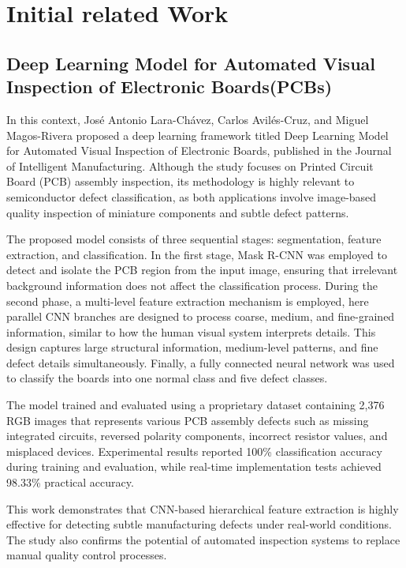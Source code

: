 \section{Initial related Work}
\subsection{Deep Learning Model for Automated Visual Inspection of Electronic Boards(PCBs)}
In this context, José Antonio Lara-Chávez, Carlos Avilés-Cruz, and Miguel Magos-Rivera proposed a deep learning framework titled Deep Learning Model for Automated Visual Inspection of Electronic Boards, published in the Journal of Intelligent Manufacturing. Although the study focuses on Printed Circuit Board (PCB) assembly inspection, its methodology is highly relevant to semiconductor defect classification, as both applications involve image-based quality inspection of miniature components and subtle defect patterns.

The proposed model consists of three sequential stages: segmentation, feature extraction, and classification. In the first stage, Mask R-CNN was employed to detect and isolate the PCB region from the input image, ensuring that irrelevant background information does not affect the classification process. During the second phase, a multi-level feature extraction mechanism is employed, here parallel CNN branches are designed to process coarse, medium, and fine-grained information, similar to how the human visual system interprets details. This design captures large structural information, medium-level patterns, and fine defect details simultaneously. Finally, a fully connected neural network was used to classify the boards into one normal class and five defect classes.

The model trained and evaluated using a proprietary dataset containing 2,376 RGB images that represents various PCB assembly defects such as missing integrated circuits, reversed polarity components, incorrect resistor values, and misplaced devices. Experimental results reported 100\% classification accuracy during training and evaluation, while real-time implementation tests achieved 98.33\% practical accuracy.

This work demonstrates that CNN-based hierarchical feature extraction is highly effective for detecting subtle manufacturing defects under real-world conditions. The study also confirms the potential of automated inspection systems to replace manual quality control processes.


